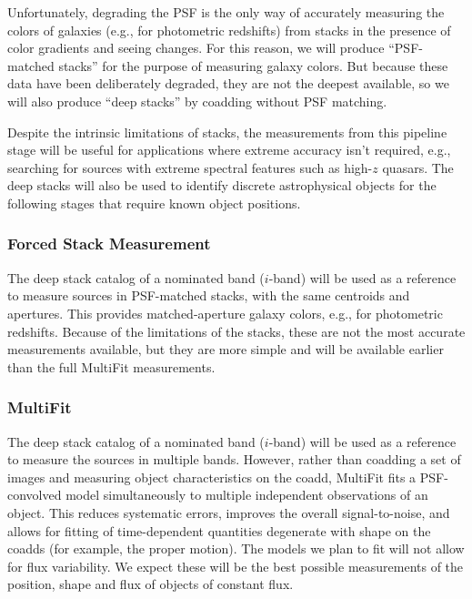 \documentclass[12pt]{article}
\begin{document}
Unfortunately, degrading the PSF is the only way of accurately measuring the colors of galaxies (e.g., for
photometric redshifts) from stacks in the presence of color gradients and seeing changes.  For this reason, we
will produce ``PSF-matched stacks'' for the purpose of measuring galaxy colors.  But because these data have
been deliberately degraded, they are not the deepest available, so we will also produce ``deep stacks'' by
coadding without PSF matching.

Despite the intrinsic limitations of stacks, the measurements from this pipeline stage will be useful for
applications where extreme accuracy isn't required, e.g., searching for sources with extreme spectral features
such as high-$z$ quasars.  The deep stacks will also be used to identify discrete astrophysical objects for
the following stages that require known object positions.

\subsubsection{Forced Stack Measurement}

The deep stack catalog of a nominated band ($i$-band) will be used as a reference to measure sources in
PSF-matched stacks, with the same centroids and apertures.  This provides matched-aperture galaxy colors,
e.g., for photometric redshifts.  Because of the limitations of the stacks, these are not the most accurate
measurements available, but they are more simple and will be available earlier than the full MultiFit
measurements.

\subsubsection{MultiFit}


The deep stack catalog of a nominated band ($i$-band) will be used as a reference to measure the sources in
multiple bands.  However, rather than coadding a set of images and measuring object characteristics on the
coadd, MultiFit fits a PSF-convolved model simultaneously to multiple independent observations of an
object. This reduces systematic errors, improves the overall signal-to-noise, and allows for fitting of
time-dependent quantities degenerate with shape on the coadds (for example, the proper motion). The models we
plan to fit will not allow for flux variability.  We expect these will be the best possible measurements of
the position, shape and flux of objects of constant flux.
\end{document}
